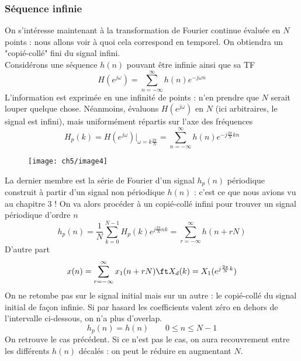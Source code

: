 		\subsubsection{Séquence infinie}
		On s'intéresse maintenant à la transformation de Fourier continue évaluée en $N$ points : 
		nous allons voir à quoi cela correspond en temporel. On obtiendra un "copié-collé" fini du 
		signal infini.\\
		Considérons une séquence $h(n)$ pouvant être infinie ainsi que sa TF
		\begin{equation}
		H(e^{j\omega}) = \sum_{n=-\infty}^\infty h(n)e^{-j\omega n}
		\end{equation}
		L'information est exprimée en une infinité de points : n'en prendre que $N$ serait louper 
		quelque chose. Néanmoins, évaluons $H(e^{j\omega})$ en $N$ (ici arbitraires, le signal est 
		infini), mais uniformément répartis sur l'axe des fréquences
		\begin{equation}
		H_p(k) = H(e^{j\omega})|_{\omega=k\frac{2\pi}{N}} = \sum_{n=-\infty}^\infty h(n)e^{-j\frac{2\pi}{
		N}kn}
		\end{equation}
\vspace{-5mm}
			\begin{wrapfigure}[22]{l}{7cm}
		\texttt{[image: ch5/image4]}
	\end{wrapfigure}	
		La dernier membre est la série de Fourier d'un signal $h_p(n)$ périodique construit à partir d'un 
		signal non périodique $h(n)$ : c'est ce que nous avions vu au chapitre 3 ! On va alors procéder 
		à un copié-collé infini pour trouver un signal périodique d'ordre $n$
		\begin{equation}
		h_p(n) = \frac{1}{N}\sum_{k=0}^{N-1} H_p(k)e^{j\frac{2\pi}{N}nk} = \sum_{r=-\infty}^\infty h(n+rN)
		\end{equation}
		D'autre part
		\begin{equation}
		x(n) = \sum_{r=-\infty}^\infty x_1(n+rN) \ft X_d(k) = X_1(e^{j\frac{2\pi}{N}k})
		\end{equation}
		On ne retombe pas sur le signal initial mais sur un autre : le copié-collé du signal initial 
		de façon infinie. Si par hasard les coefficients valent zéro en dehors de l'intervalle 
		ci-dessous, on n'a plus d'overlap.
		\begin{equation}
		h_p (n) = h(n)\qquad 0\leq n \leq N-1
		\end{equation}
		On retrouve le cas précédent. Si ce n'est pas le cas, on aura recouvrement entre les différents 
		$h(n)$ décalés : on peut le réduire en augmentant $N$.

